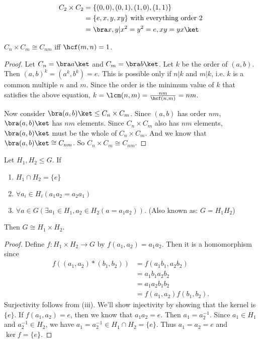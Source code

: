 \documentclass[a4paper]{article}
\begin{document}
  \begin{eg}
    \begin{align*}
      C_2\times C_2 &= \{(0, 0), (0, 1), (1, 0), (1, 1)\}\\
      &= \{e, x, y, xy\} \text{ with everything order 2}\\
      &= \bra x, y|x^2=y^2=e, xy = yx\ket
    \end{align*}
  \end{eg}

  \begin{prop}
    $C_n\times C_m\cong C_{nm}$ iff $\hcf(m, n) = 1$.
  \end{prop}

  \begin{proof}
    Let $C_n = \bra a\ket$ and $C_m = \bra b \ket$. Let $k$ be the order of $(a, b)$. Then $(a, b)^k = (a^k, b^k) = e$. This is possible only if $n | k$ and $m | k$, i.e. $k$ is a common multiple $n$ and $m$. Since the order is the minimum value of $k$ that satisfies the above equation, $k = \lcm(n, m) = \frac{nm}{\hcf(n, m)} = nm$.

    Now consider $\bra (a, b)\ket \leq C_n\times C_m$. Since $(a, b)$ has order $nm$, $\bra (a, b)\ket$ has $nm$ elements. Since $C_n\times C_m$ also has $nm$ elements, $\bra (a, b)\ket$ must be the whole of $C_n\times C_m$. And we know that $\bra (a, b)\ket\cong C_{nm}$. So $C_n\times C_m \cong C_{nm}$.
  \end{proof}

  \begin{prop}
    Let $H_1, H_2\leq G$. If
    \begin{enumerate}
      \item $H_1\cap H_2 = \{e\}$
      \item $\forall a_i\in H_i(a_1a_2=a_2a_1)$
      \item $\forall a\in G(\exists a_1\in H_1, a_2\in H_2(a = a_1a_2))$. (Also known as: $G=H_1H_2$)
    \end{enumerate}
    Then $G\cong H_1\times H_2$.
  \end{prop}

  \begin{proof}
    Define $f:H_1\times H_2\rightarrow G$ by $f(a_1, a_2) = a_1a_2$. Then it is a homomorphism since
    \begin{align*}
      f((a_1, a_2)*(b_1,b_2)) &= f(a_1b_1, a_2b_2)\\
      &= a_1b_1a_2b_2\\
      &= a_1a_2b_1b_2\\
      &= f(a_1, a_2)f(b_1,b_2).
    \end{align*}
    Surjectivity follows from (iii). We'll show injectivity by showing that the kernel is $\{e\}$. If $f(a_1, a_2)=e$, then we know that $a_1a_2 = e$. Then $a_1=a_2^{-1}$. Since $a_1 \in H_1$ and $a_2^{-1} \in H_2$, we have $a_1 = a_2^{-1} \in H_1\cap H_2 = \{e\}$. Thus $a_1 = a_2 = e$ and $\ker f = \{e\}$.
  \end{proof}
\end{document}

